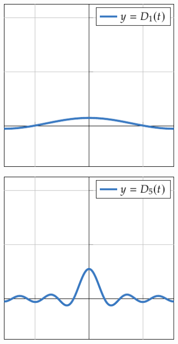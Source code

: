 \documentclass[a4paper, 11pt, oneside]{report}
\begin{document}
\begin{figure}[H]
  \centering
  \begin{subfigure}[b]{0.49\textwidth}
    \centering
    \includegraphics{./plot15/main.pdf}
  \end{subfigure}
  \begin{subfigure}[b]{0.49\textwidth}
    \centering
    \includegraphics{./plot16/main.pdf}
  \end{subfigure}
\end{figure}
\end{document}
